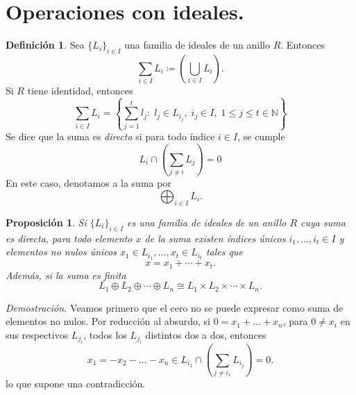 \documentclass[11pt]{book}
\def\N{\mathbb{N}}
\newtheorem{prop}[theorem]{Proposición}
\theoremstyle{definition}
\newtheorem{definition}{Definición}[section]
\begin{document}
\section{Operaciones con ideales.}
\begin{definition}
    Sea $\{L_i\}_{i\in I}$ una familia de ideales de un anillo $R$. Entonces\[
    \sum_{i\in I}L_i\coloneq\left(\bigcup_{i\in I} L_i\right).
    \]Si $R$ tiene identidad, entonces\[
    \sum_{i\in I}L_i=\left\{\sum_{j=1}^t l_j:\; l_j\in L_{i_j},\; i_j\in I,\; 1\leq j\leq t\in\N\right\}
    \]Se dice que la suma es \textit{directa} si para todo índice $i\in I$, se cumple\[
    L_i\cap\left(\sum_{j\neq i}L_j\right)=0
    \]En este caso, denotamos a la suma por\[
    \bigoplus_{i\in I}L_i.
    \]
\end{definition}
\begin{prop}
    Si $\{L_i\}_{i\in I}$ es una familia de ideales de un anillo $R$ cuya suma es directa, para todo elemento $x$ de la suma existen índices únicos $i_1,\dots,i_t\in I$ y elementos no nulos únicos $x_1\in L_{i_1},\dots,x_t\in L_{i_t}$ tales que\[
    x=x_1+\cdots+x_t.
    \]Además, si la suma es finita\[
    L_1\oplus L_2\oplus \cdots\oplus L_n\cong L_1\times L_2\times\cdots\times L_n.
    \]
\end{prop}
\noindent\textit{Demostración.} Veamos primero que el cero no se puede expresar como suma de elementos no nulos. Por reducción al absurdo, si $0=x_1+\dots+x_n$, para $0\neq x_i$ en sus respectivos $L_{j_i}$, todos los $L_{j_i}$ distintos dos a dos, entonces\[
x_1=-x_2-\dots-x_n\in L_{i_1}\cap\left(\sum_{j\neq i_1}L_{i_j}\right)=0.
\]lo que supone una contradicción.
\end{document}
